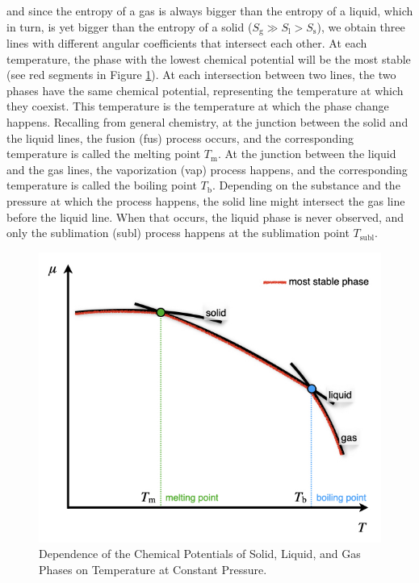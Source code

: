 \documentclass[
  9pt,
]{extbook}
\theoremstyle{definition}
\theoremstyle{definition}
\theoremstyle{definition}
\theoremstyle{definition}
\theoremstyle{remark}
\begin{document}
and since the entropy of a gas is always bigger than the entropy of a liquid, which in turn, is yet bigger than the entropy of a solid (\(S_{\text{g}} \gg S_{\text{l}}>S_{\text{s}}\)), we obtain three lines with different angular coefficients that intersect each other. At each temperature, the phase with the lowest chemical potential will be the most stable (see red segments in Figure \ref{fig:FigPhase1}). At each intersection between two lines, the two phases have the same chemical potential, representing the temperature at which they coexist. This temperature is the temperature at which the phase change happens. Recalling from general chemistry, at the junction between the solid and the liquid lines, the fusion (fus) process occurs, and the corresponding temperature is called the melting point \(T_{\text{m}}\). At the junction between the liquid and the gas lines, the vaporization (vap) process happens, and the corresponding temperature is called the boiling point \(T_{\text{b}}\). Depending on the substance and the pressure at which the process happens, the solid line might intersect the gas line before the liquid line. When that occurs, the liquid phase is never observed, and only the sublimation (subl) process happens at the sublimation point \(T_{\text{subl}}\).

\begin{figure}

{\centering \includegraphics[width=0.6\linewidth]{./img/OEP_Figures.016} 

}

\caption{Dependence of the Chemical Potentials of Solid, Liquid, and Gas Phases on Temperature at Constant Pressure.}\label{fig:FigPhase1}
\end{figure}
\end{document}
